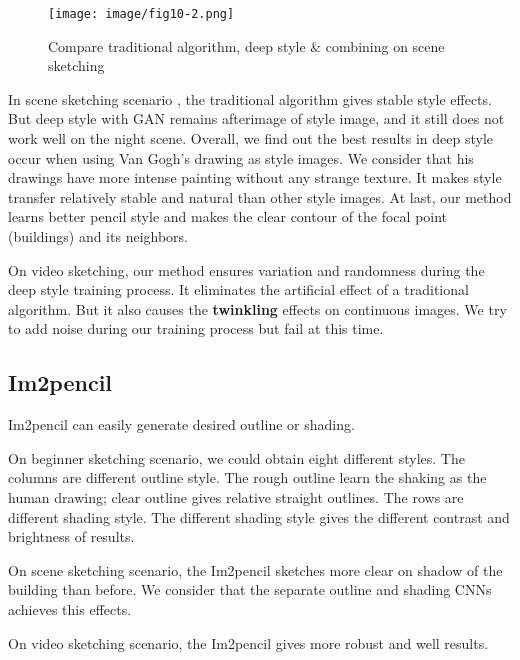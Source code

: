 \begin{figure}
  \centering
  \texttt{[image: image/fig10-2.png]}
  \caption{Compare traditional algorithm, deep style \& combining on scene sketching}
  \label{fig10-2}
\end{figure}
In scene sketching scenario , the traditional algorithm gives stable style effects.
But deep style with GAN remains afterimage of style image, and it still does not work well on the night scene. Overall, we find out the best results in deep style occur when using Van Gogh's drawing as style images. We consider that his drawings have more intense painting without any strange texture. It makes style transfer relatively stable and natural than other style images.
At last, our method learns better pencil style and makes the clear contour of the focal point (buildings) and its neighbors.


On video sketching, our method ensures variation and randomness during the deep style training process. It eliminates the artificial effect of a traditional algorithm. But it also causes the \textbf{twinkling} effects on continuous images. We try to add noise during our training process but fail at this time.

\subsection{Im2pencil}
Im2pencil can easily generate desired outline or shading.

On beginner sketching scenario, we could obtain eight different styles. The columns are different outline style. The rough outline learn the shaking as the human drawing; clear outline gives relative straight outlines. The rows are different shading style. The different shading style gives the different contrast and brightness of results.

On scene sketching scenario, the Im2pencil sketches more clear on shadow of the building than before. We consider that the separate outline and shading CNNs achieves this effects.

On video sketching scenario, the Im2pencil gives more robust and well results.
